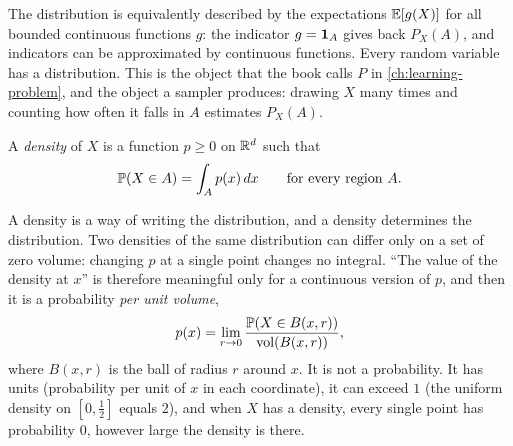 \begin{notechapter}
The distribution is equivalently described by the expectations $\mathbb{E}[g(X)]$ for all bounded continuous
functions $g$: the indicator $g = \mathbf{1}_A$ gives back $P_X(A)$, and indicators can be approximated by
continuous functions. Every random variable has a distribution. This is the object that the book
calls $P$ in \cref{ch:learning-problem}, and the object a sampler produces: drawing $X$ many times and
counting how often it falls in $A$ estimates $P_X(A)$.

\begin{definition}[Density]\label{distributions-densities:def:density}
A \emph{density} of $X$ is a function $p\geq0$ on $\mathbb{R}^d$ such that
\[
  \mathbb{P}(X\in A) = \int_Ap(x)\,dx\qquad\text{for every region }A.
\]
\end{definition}

A density is a way of writing the distribution, and a density determines the distribution. Two
densities of the same distribution can differ only on a set of zero volume: changing $p$ at a single
point changes no integral. ``The value of the density at $x$'' is therefore meaningful only for a
continuous version of $p$, and then it is a probability \emph{per unit volume},
\[
  p(x) = \lim_{r\to0}\frac{\mathbb{P}(X\in B(x, r))}{\operatorname{vol}(B(x, r))},
\]
where $B(x, r)$ is the ball of radius $r$ around $x$. It is not a probability. It has units (probability
per unit of $x$ in each coordinate), it can exceed $1$ (the uniform density on $[0, \frac12]$ equals $2$),
and when $X$ has a density, every single point has probability $0$, however large the density is there.


\end{notechapter}
